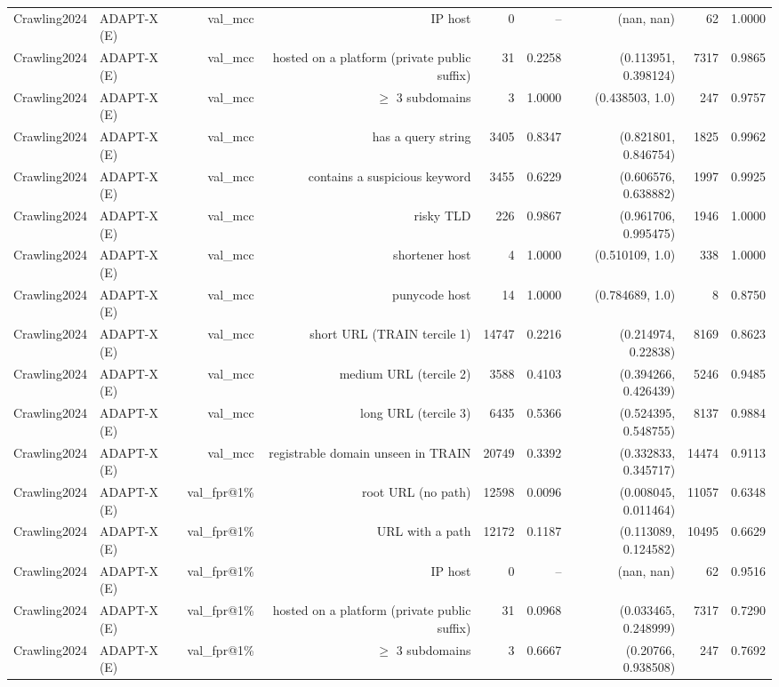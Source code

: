 \begin{table}[t]
\begin{tabular}{llrrrrrrr}
Crawling2024 & ADAPT-X (E) & val\_mcc & IP host & 0 & -- & (nan, nan) & 62 & 1.0000 \\
Crawling2024 & ADAPT-X (E) & val\_mcc & hosted on a platform (private public suffix) & 31 & 0.2258 & (0.113951, 0.398124) & 7317 & 0.9865 \\
Crawling2024 & ADAPT-X (E) & val\_mcc & $\geq$ 3 subdomains & 3 & 1.0000 & (0.438503, 1.0) & 247 & 0.9757 \\
Crawling2024 & ADAPT-X (E) & val\_mcc & has a query string & 3405 & 0.8347 & (0.821801, 0.846754) & 1825 & 0.9962 \\
Crawling2024 & ADAPT-X (E) & val\_mcc & contains a suspicious keyword & 3455 & 0.6229 & (0.606576, 0.638882) & 1997 & 0.9925 \\
Crawling2024 & ADAPT-X (E) & val\_mcc & risky TLD & 226 & 0.9867 & (0.961706, 0.995475) & 1946 & 1.0000 \\
Crawling2024 & ADAPT-X (E) & val\_mcc & shortener host & 4 & 1.0000 & (0.510109, 1.0) & 338 & 1.0000 \\
Crawling2024 & ADAPT-X (E) & val\_mcc & punycode host & 14 & 1.0000 & (0.784689, 1.0) & 8 & 0.8750 \\
Crawling2024 & ADAPT-X (E) & val\_mcc & short URL (TRAIN tercile 1) & 14747 & 0.2216 & (0.214974, 0.22838) & 8169 & 0.8623 \\
Crawling2024 & ADAPT-X (E) & val\_mcc & medium URL (tercile 2) & 3588 & 0.4103 & (0.394266, 0.426439) & 5246 & 0.9485 \\
Crawling2024 & ADAPT-X (E) & val\_mcc & long URL (tercile 3) & 6435 & 0.5366 & (0.524395, 0.548755) & 8137 & 0.9884 \\
Crawling2024 & ADAPT-X (E) & val\_mcc & registrable domain unseen in TRAIN & 20749 & 0.3392 & (0.332833, 0.345717) & 14474 & 0.9113 \\
Crawling2024 & ADAPT-X (E) & val\_fpr@1\% & root URL (no path) & 12598 & 0.0096 & (0.008045, 0.011464) & 11057 & 0.6348 \\
Crawling2024 & ADAPT-X (E) & val\_fpr@1\% & URL with a path & 12172 & 0.1187 & (0.113089, 0.124582) & 10495 & 0.6629 \\
Crawling2024 & ADAPT-X (E) & val\_fpr@1\% & IP host & 0 & -- & (nan, nan) & 62 & 0.9516 \\
Crawling2024 & ADAPT-X (E) & val\_fpr@1\% & hosted on a platform (private public suffix) & 31 & 0.0968 & (0.033465, 0.248999) & 7317 & 0.7290 \\
Crawling2024 & ADAPT-X (E) & val\_fpr@1\% & $\geq$ 3 subdomains & 3 & 0.6667 & (0.20766, 0.938508) & 247 & 0.7692 \\

\end{tabular}
\end{table}

